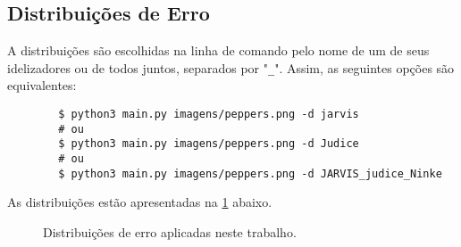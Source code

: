 \subsection{Distribuições de Erro} \label{sec:distribuicoes}

    A distribuições são escolhidas na linha de comando pelo nome de um de seus idelizadores ou de todos juntos, separados por "\texttt{\_}". Assim, as seguintes opções são equivalentes:

    \begin{verbatim}
        $ python3 main.py imagens/peppers.png -d jarvis
        # ou
        $ python3 main.py imagens/peppers.png -d Judice
        # ou
        $ python3 main.py imagens/peppers.png -d JARVIS_judice_Ninke
    \end{verbatim}

    As distribuições estão apresentadas na \cref{fig:distribuicoes} abaixo.

    \begin{figure}[H]
        \centering
        
        \caption{Distribuições de erro aplicadas neste trabalho.}
        \label{fig:distribuicoes}
    \end{figure}
